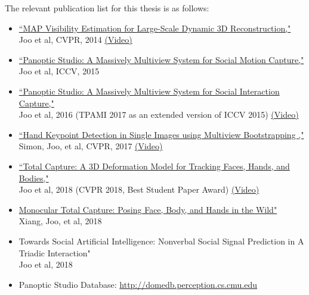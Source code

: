 The relevant publication list for this thesis is as follows: 
\begin{itemize}
	\item  \noindent \href{http://www.cs.cmu.edu/~hanbyulj/14/CVPR_2014_Visibility.pdf}{``MAP Visibility Estimation for Large-Scale Dynamic 3D Reconstruction,"}\\ 
	Joo et al, CVPR, 2014 \href{https://www.youtube.com/watch?v=LaHTjBWago8}{(Video)}
	
	\item \noindent \href{http://www.cs.cmu.edu/~hanbyulj/panoptic-studio/ICCV2015_SMC.pdf}{``Panoptic Studio: A Massively Multiview System for Social Motion Capture,"}\\ 
	Joo et al, ICCV, 2015 
	
	\item \noindent \href{https://ieeexplore.ieee.org/document/8187699}{``Panoptic Studio: A Massively Multiview System for Social Interaction Capture,"}\\ 
	Joo et al, 2016 (TPAMI 2017 as an extended version of ICCV 2015) \href{https://www.youtube.com/watch?v=m0-7HnWvxG4}{(Video)}
	
	\item \noindent \href{https://arxiv.org/abs/1704.07809}{``Hand Keypoint Detection in Single Images using Multiview Bootstrapping ,"}\\ 
	Simon, Joo, et al, CVPR, 2017 \href{https://www.youtube.com/watch?v=Lajt6vS_dSM}{(Video)}	
	
	\item \noindent \href{http://openaccess.thecvf.com/content_cvpr_2018/papers/Joo_Total_Capture_A_CVPR_2018_paper.pdf}{``Total Capture: A 3D Deformation Model for Tracking Faces, Hands, and Bodies,"}\\ 
	Joo et al, 2018 (CVPR 2018, Best Student Paper Award) \href{https://www.youtube.com/watch?v=5QzdXQSf-oY}{(Video)}	
	
	\item \noindent 
	\href{https://arxiv.org/pdf/1812.01598.pdf}{Monocular Total Capture: Posing Face, Body, and Hands in the Wild"}\\ 
	Xiang, Joo, et al, 2018
	
	\item \noindent 
	{Towards Social Artificial Intelligence: Nonverbal Social Signal Prediction in A Triadic Interaction"}\\ 
	Joo et al, 2018
	
	\item \noindent Panoptic Studio Database: \url{http://domedb.perception.cs.cmu.edu}
	
	
\end{itemize}



